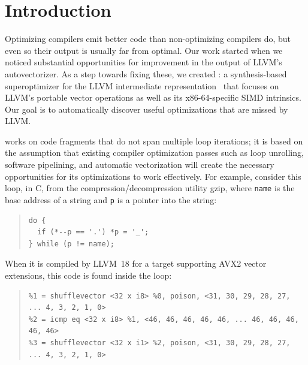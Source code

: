 \section{Introduction}

Optimizing compilers emit better code than non-optimizing compilers
do, but even so their output is usually far from optimal.
%
Our work started when we noticed substantial opportunities for
improvement in the output of LLVM's autovectorizer.
%
As a step towards fixing these, we created \minotaur{}: a synthesis-based
superoptimizer for the LLVM intermediate
representation~\cite{LLVM:CGO04} that focuses on LLVM's portable
vector operations as well as its x86-64-specific SIMD intrinsics.
%
Our goal is to automatically discover useful optimizations that are
missed by LLVM\@.


\minotaur{} works on code fragments that do not span multiple loop
iterations; it is based on the assumption that existing compiler
optimization passes such as loop unrolling, software pipelining, and
automatic vectorization will create the necessary opportunities for
its optimizations to work effectively.
%
For example, consider this loop, in C, from the
compression/decompression utility gzip, where \texttt{name} is the
base address of a string and \texttt{p} is a pointer into the string:

{\begin{quote}
\begin{verbatim}
do {
  if (*--p == '.') *p = '_';
} while (p != name);
\end{verbatim}
\end{quote}}

When it is compiled by LLVM~18 for a target supporting AVX2
vector extensions, this code is found inside the loop:

{\begin{quote}
\begin{verbatim}
%1 = shufflevector <32 x i8> %0, poison, <31, 30, 29, 28, 27, ... 4, 3, 2, 1, 0>
%2 = icmp eq <32 x i8> %1, <46, 46, 46, 46, 46, ... 46, 46, 46, 46, 46>
%3 = shufflevector <32 x i1> %2, poison, <31, 30, 29, 28, 27, ... 4, 3, 2, 1, 0>
\end{verbatim}
\end{quote}}

